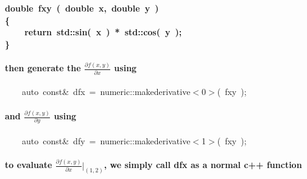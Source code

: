 \documentclass[9pt,onside]{article}
\newcommand{\hlstd}[1]{\textcolor[rgb]{0.2,0,0.4}{#1}}
\newcommand{\hlnum}[1]{\textcolor[rgb]{0.2,0.73,0.02}{#1}}
\newcommand{\hlopt}[1]{\textcolor[rgb]{0.33,0.33,0.33}{#1}}
\newcommand{\hlkwa}[1]{\textcolor[rgb]{1,0.19,0.19}{#1}}
\newcommand{\hlkwb}[1]{\textcolor[rgb]{0.96,0.55,0.14}{#1}}
\newcommand{\hlkwc}[1]{\textcolor[rgb]{0,0,1}{#1}}
\newcommand{\hlkwd}[1]{\textcolor[rgb]{0.82,0.11,0.93}{#1}}
\begin{document}
\paragraph{ \hlstd{}\hspace*{\fill}\\
\hlkwb{double\ }\hlstd{}\hlkwd{fxy\ }\hlstd{}\hlopt{(\ }\hlstd{}\hlkwb{double\ }\hlstd{x}\hlopt{,\ }\hlstd{}\hlkwb{double\ }\hlstd{y\ }\hlopt{)}\hspace*{\fill}\\
\hlstd{}\hlopt{\{}\hspace*{\fill}\\
\hlstd{}\hlstd{\ \ \ \ }\hlstd{}\hlkwa{return\ }\hlstd{std}\hlopt{::}\hlstd{}\hlkwd{sin}\hlstd{}\hlopt{(\ }\hlstd{x\ }\hlopt{)\ {*}\ }\hlstd{std}\hlopt{::}\hlstd{}\hlkwd{cos}\hlstd{}\hlopt{(\ }\hlstd{y\ }\hlopt{);}\hspace*{\fill}\\
\hlstd{}\hlopt{\}}\hspace*{\fill}\\
}

\paragraph{then generate the $\frac{\partial{f(x,y)}}{\partial{x}}$ using\\} 

\hlstd{}\hlstd{\ \ \ \ }\hlstd{}\hlkwc{auto\ }\hlstd{}\hlkwb{const}\hlstd{}\hlopt{\&\ }\hlstd{dfx\ }\hlopt{=\ }\hlstd{numeric}\hlopt{::}\hlstd{make\textunderscore derivative}\hlopt{$<$}\hlstd{}\hlnum{0}\hlstd{}\hlopt{$>$(\ }\hlstd{fxy\ }\hlopt{);}\hspace*{\fill}\\

\paragraph{and $\frac{\partial{f(x,y)}}{\partial{y}}$ using\\}

\hlstd{}\hlstd{\ \ \ \ }\hlstd{}\hlkwc{auto\ }\hlstd{}\hlkwb{const}\hlstd{}\hlopt{\&\ }\hlstd{dfy\ }\hlopt{=\ }\hlstd{numeric}\hlopt{::}\hlstd{make\textunderscore derivative}\hlopt{$<$}\hlstd{}\hlnum{1}\hlstd{}\hlopt{$>$(\ }\hlstd{fxy\ }\hlopt{);}\hspace*{\fill}\\

\paragraph{to evaluate $\frac{\partial{f(x,y)}}{\partial{x}} \Big|_{(1,2)}$, we simply call \hlkwd{dfx} as a normal c++ function\\}
\end{document}
